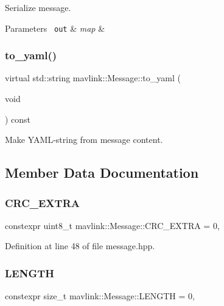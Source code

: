 Serialize message.


\begin{DoxyParams}[1]{Parameters}
\mbox{\texttt{ out}}  & {\em map} & \\
\hline
\end{DoxyParams}
\mbox{\label{structmavlink_1_1Message_a6a2a01c5fdb6e6039a89f43923085e81}} 
\subsubsection{\texorpdfstring{to\_yaml()}{to\_yaml()}}
{\footnotesize\ttfamily virtual std\+::string mavlink\+::\+Message\+::to\+\_\+yaml (\begin{DoxyParamCaption}\item[{void}]{ }\end{DoxyParamCaption}) const\hspace{0.3cm}{\ttfamily [pure virtual]}}

Make Y\+A\+M\+L-\/string from message content. 

\subsection{Member Data Documentation}
\mbox{\label{structmavlink_1_1Message_ad261058b3a7dc68e69cd631e5cd766a2}} 
\subsubsection{\texorpdfstring{CRC\_EXTRA}{CRC\_EXTRA}}
{\footnotesize\ttfamily constexpr uint8\+\_\+t mavlink\+::\+Message\+::\+C\+R\+C\+\_\+\+E\+X\+T\+RA = 0\hspace{0.3cm}{\ttfamily [static]}, {\ttfamily [constexpr]}}



Definition at line 48 of file message.\+hpp.

\mbox{\label{structmavlink_1_1Message_a5bf17835d1732e0b83212a853a838c6b}} 
\subsubsection{\texorpdfstring{LENGTH}{LENGTH}}
{\footnotesize\ttfamily constexpr size\+\_\+t mavlink\+::\+Message\+::\+L\+E\+N\+G\+TH = 0\hspace{0.3cm}{\ttfamily [static]}, {\ttfamily [constexpr]}}



